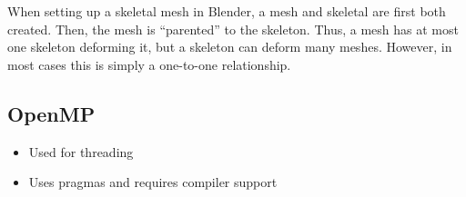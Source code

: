 When setting up a skeletal mesh in Blender, a mesh and skeletal are first both created. Then, the mesh is ``parented'' to the skeleton. Thus, a mesh has at most one skeleton deforming it, but a skeleton can deform many meshes. However, in most cases this is simply a one-to-one relationship.

\subsection{OpenMP}
\begin{itemize}
 \item Used for threading
 \item Uses pragmas and requires compiler support
\end{itemize}



%
